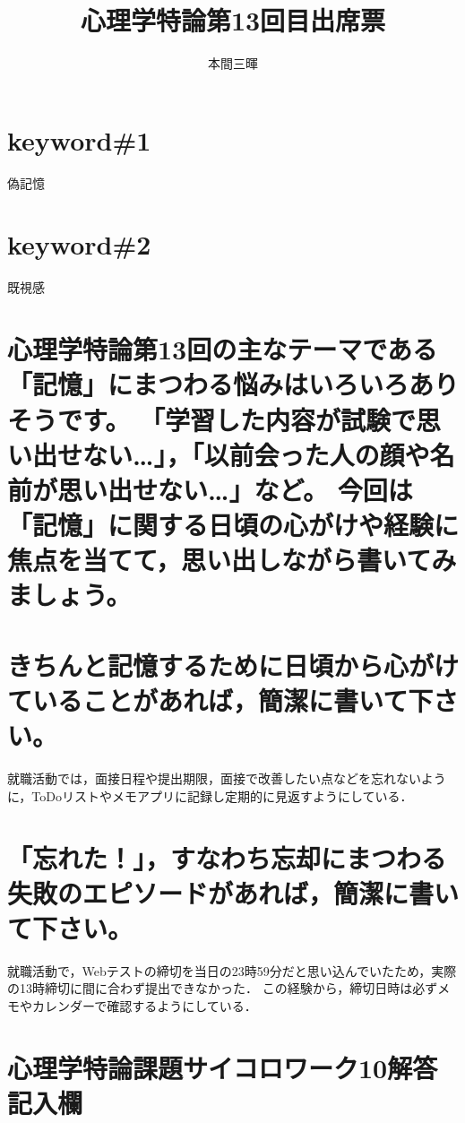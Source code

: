 \documentclass[titlepage,a4paper]{jsarticle}
\title{心理学特論第13回目出席票}
\author{本間三暉}
\begin{document}
\maketitle
\section*{keyword\#1}
偽記憶
\section*{keyword\#2}
既視感
\section*{心理学特論第13回の主なテーマである「記憶」にまつわる悩みはいろいろありそうです。
「学習した内容が試験で思い出せない…」，「以前会った人の顔や名前が思い出せない…」など。
今回は「記憶」に関する日頃の心がけや経験に焦点を当てて，思い出しながら書いてみましょう。}
\section{きちんと記憶するために日頃から心がけていることがあれば，簡潔に書いて下さい。}
就職活動では，面接日程や提出期限，面接で改善したい点などを忘れないように，ToDoリストやメモアプリに記録し定期的に見返すようにしている．

\section{「忘れた！」，すなわち忘却にまつわる失敗のエピソードがあれば，簡潔に書いて下さい。}
就職活動で，Webテストの締切を当日の23時59分だと思い込んでいたため，実際の13時締切に間に合わず提出できなかった．
この経験から，締切日時は必ずメモやカレンダーで確認するようにしている．

\newpage
\section{心理学特論課題サイコロワーク10解答記入欄}

\end{document}
